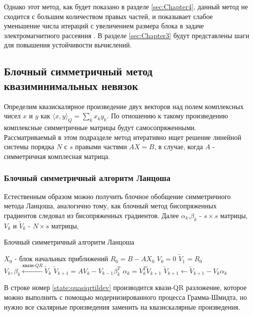 Однако этот метод, как будет показано в разделе \ref{sec:Chapter4}, данный метод 
не сходится с большим количеством правых частей, и показывает слабое уменьшение 
числа итераций с увеличением размера блока в задаче электромагнитного рассеяния 
\cite{stavtsev2009application}. В разделе \ref{sec:Chapter3} будут представлены
шаги для повышения устойчивости вычислений. 
\subsection[Блочный симметричный метод квазиминимальных невязок]{Блочный симметричный метод квазиминимальных невязок \cite{doi:10.1137/0917019}}
Определим квазискалярное произведение двух векторов над полем комплексных чисел
 $x$ и $y$ как $\langle x,y\rangle _Q=\sum_k x_k y_k$. По отношению к такому произведению
 комплексные симметричные матрицы будут самосопряженными. Рассматриваемый в этом подразделе метод 
 итеративно ищет решение линейной системы порядка $N$ с $s$ правыми частями $AX=B$, в случае, когда $A$ - 
 симметричная комплесная матрица.   
\subsubsection[Блочный симметричный алгоритм Ланцоша]{Блочный симметричный алгоритм Ланцоша}
Естественным образом можно получить блочное обобщение симметричного метода Ланцоша, 
аналогично тому, как блочный метод бисопряженных градиентов следовал из бисопряженных градиентов.
Далее $\alpha_k$,$\beta_k$ - $s \times s$ матрицы, $V_k$ и $\tilde{V}_k$ - $N \times s$ 
матрицы, 
\begin{algorithm}[H]
    \caption{Блочный симметричный алгоритм Ланцоша}
    \begin{algorithmic}[1]
        \State $X_0$ - блок начальных приближений
        \State $R_0 = B - AX_0$
        \State $V_0 = 0$
        \State $\tilde{V}_1 = R_0$
            \State $V_k, \beta_k \xleftarrow{\text{квази-} QR} \tilde{V}_k$ \label{state:quasiqrtildev}
            \State $\tilde{V}_{k+1} = AV_k - V_{k-1}\beta_k^T$
            \State $\alpha_k = V_k^T \tilde{V}_{k+1}$
            \State $\tilde{V}_{k+1} \gets \tilde{V}_{k+1} - V_k \alpha_k$
        \EndFor
    \end{algorithmic}
\end{algorithm}
В строке номер \ref{state:quasiqrtildev} производится квази-QR разложение, которое 
можно выполнить с помощью модернизированного процесса Грамма-Шмидта, но нужно все скалярные
произведения заменить на квазискалярные произведения. 

